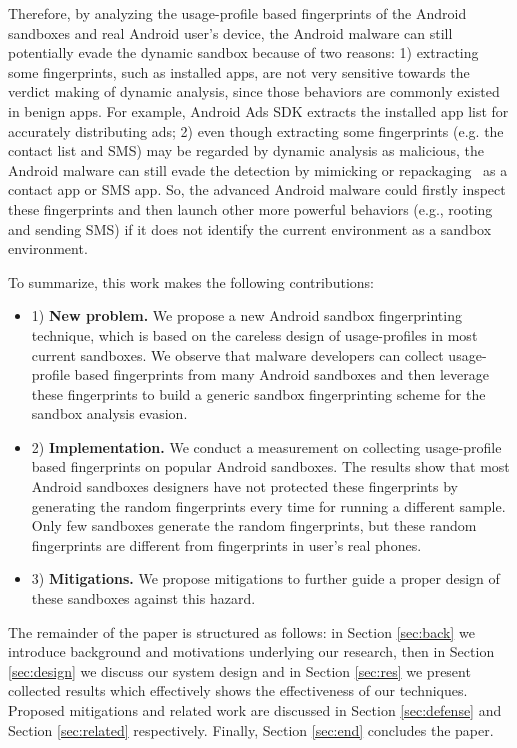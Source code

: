 Therefore, by analyzing the usage-profile based fingerprints of the Android sandboxes and real Android user's device, the Android malware can still potentially evade the dynamic sandbox because of two reasons: 1) extracting some fingerprints, such as installed apps, are not very sensitive towards the verdict making of dynamic analysis, since those behaviors are commonly existed in benign apps. For example, Android Ads SDK extracts the installed app list for accurately distributing ads; 2) even though extracting some fingerprints (e.g. the contact list and SMS) may be regarded by dynamic analysis as malicious, the Android malware can still evade the detection by mimicking or repackaging~\cite{zhang2014viewdroid} as a contact app or SMS app. So, the advanced Android malware could firstly inspect these fingerprints and then launch other more powerful behaviors (e.g., rooting and sending SMS) if it does not identify the current environment as a sandbox environment.

To summarize, this work makes the following contributions:
\begin{itemize}
\item 1) {\bf New problem.} We propose a new Android sandbox fingerprinting technique, which is based on the careless design of usage-profiles in most current sandboxes. We observe that malware developers can collect usage-profile based fingerprints from many Android sandboxes and then leverage these fingerprints to build a generic sandbox fingerprinting scheme for the sandbox analysis evasion. 
\item 2) {\bf Implementation.} We conduct a measurement on collecting usage-profile based fingerprints on popular Android sandboxes. The results show that most Android sandboxes designers have not protected these fingerprints by generating the random fingerprints every time for running a different sample. Only few sandboxes generate the random fingerprints, but these random fingerprints are different from fingerprints in user's real phones.
\item 3) {\bf Mitigations.} We propose mitigations to further guide a proper design of these sandboxes against this hazard.
\end{itemize}

The remainder of the paper is structured as follows: in Section \ref{sec:back} we introduce background and motivations underlying our research, then in Section \ref{sec:design} we discuss our system design and in Section \ref{sec:res} we present collected results which effectively shows the effectiveness of our techniques. Proposed mitigations and related work are discussed in Section \ref{sec:defense} and Section \ref{sec:related} respectively. Finally, Section \ref{sec:end} concludes the paper.